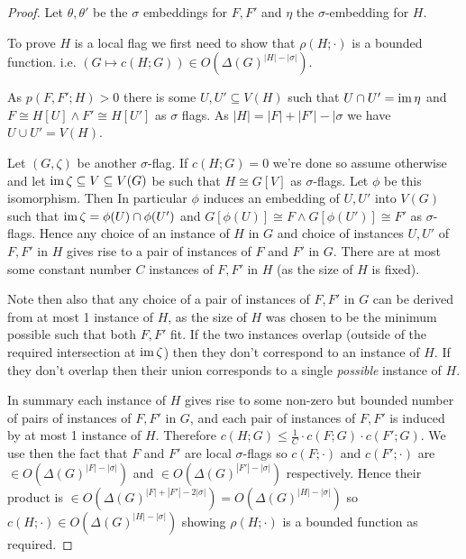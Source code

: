 \begin{proof}
    Let $\theta,\theta'$ be the $\sigma$ embeddings for $F, F'$ and $\eta$ the
    $\sigma$-embedding for $H.$

    To prove $H$ is a local flag we first need to show that $\rho(H; \cdot)$ is a bounded function.
    i.e. $(G \mapsto c(H; G)) \in O(\Delta(G)^{|H|-|\sigma|}).$

    As $p(F, F'; H) > 0$ there is some $U, U'\subseteq V(H)$ such that $U\cap U'=\operatorname{im}\eta$ and
    $F \cong H[U] \land F'\cong H[U']$ as $\sigma$ flags. As $|H|=|F|+|F'|-|\sigma$ we
    have $U \cup U' = V(H)$.

    Let $(G, \zeta)$ be another $\sigma$-flag. If $c(H; G) = 0$ we're done so assume otherwise and
    let $\operatorname{im}\zeta \subseteq V\subseteq V(G)$ be such that $H \cong G[V]$ as $\sigma$-flags. Let
    $\phi$ be this isomorphism. Then In particular $\phi$ induces an embedding of $U, U'$ into
    $V(G)$ such that $\operatorname{im}\zeta = \phi(U) \cap \phi(U')$ and $G[\phi(U)] \cong F\land G[\phi(U')]
    \cong F'$ as $\sigma$-flags.  Hence any choice of an instance of $H$ in $G$ and choice of
    instances $U, U'$ of $F, F'$ in $H$ gives rise to a pair of instances of $F$ and $F'$ in $G.$
    There are at most some constant number $C$ instances of $F, F'$ in $H$ (as the size of $H$ is
    fixed).

    Note then also that any choice of a pair of instances of $F, F'$ in $G$ can be derived from at
    most 1 instance of $H$, as the size of $H$ was chosen to be the minimum possible such that both
    $F,F'$ fit. If the two instances overlap (outside of the required intersection at $\operatorname{im}\zeta$)
    then they don't correspond to an instance of $H.$ If they don't overlap then their
    union corresponds to a single \textit{possible} instance of $H$.

    In summary each instance of $H$ gives rise to some non-zero but bounded number of pairs of
    instances of $F, F'$ in $G$, and each pair of instances of $F, F'$ is induced by at most
    1 instance of $H.$
    Therefore $c(H; G) \leq \frac{1}{C}\cdot c(F; G)\cdot c(F'; G)$. We use then
    the fact that $F$ and $F'$ are local $\sigma$-flags so $c(F; \cdot)$ and
    $c(F'; \cdot)$ are $\in O(\Delta(G)^{|F|-|\sigma|})$ and $\in O(\Delta(G)^{|F'|-|\sigma|})$
    respectively. Hence their product is
    $\in O(\Delta(G)^{|F|+|F'|-2|\sigma|}) = O(\Delta(G)^{|H|-|\sigma|})$ so
    $c(H; \cdot) \in O(\Delta(G)^{|H|-|\sigma|})$ showing $\rho(H; \cdot)$ is a bounded function as
    required.


\end{proof}
